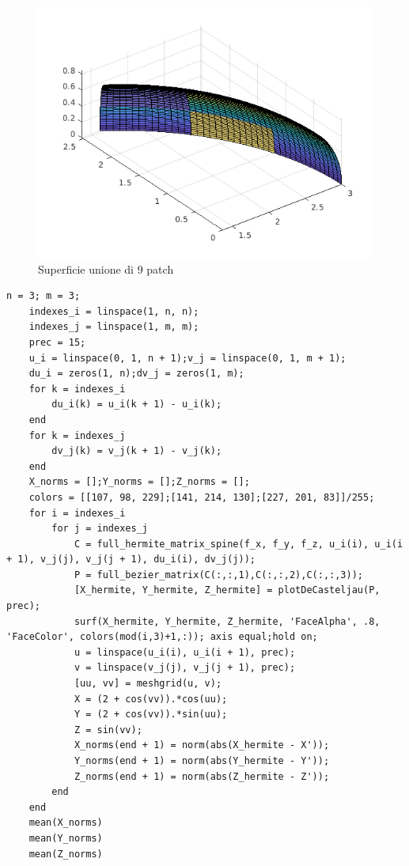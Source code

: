 \documentclass[12pt]{article}
\begin{document}
\begin{figure}[H]
    \centering

    \includegraphics[scale=0.5]{img/spline3nmpatch.png}

    \caption{Superficie unione di 9 patch }\label{fig:8}
\end{figure}
\newpage
\begin{lstlisting}[caption={Errore interpolazione caso spline}, style=matlab, label={patchnm9}, captionpos=b]
	n = 3; m = 3;
	indexes_i = linspace(1, n, n);
	indexes_j = linspace(1, m, m);
	prec = 15;
	u_i = linspace(0, 1, n + 1);v_j = linspace(0, 1, m + 1);
	du_i = zeros(1, n);dv_j = zeros(1, m);
	for k = indexes_i
		du_i(k) = u_i(k + 1) - u_i(k);
	end
	for k = indexes_j
		dv_j(k) = v_j(k + 1) - v_j(k);
	end
	X_norms = [];Y_norms = [];Z_norms = [];
	colors = [[107, 98, 229];[141, 214, 130];[227, 201, 83]]/255;	
	for i = indexes_i
		for j = indexes_j
			C = full_hermite_matrix_spine(f_x, f_y, f_z, u_i(i), u_i(i + 1), v_j(j), v_j(j + 1), du_i(i), dv_j(j));
			P = full_bezier_matrix(C(:,:,1),C(:,:,2),C(:,:,3));
			[X_hermite, Y_hermite, Z_hermite] = plotDeCasteljau(P, prec);
			surf(X_hermite, Y_hermite, Z_hermite, 'FaceAlpha', .8, 'FaceColor', colors(mod(i,3)+1,:)); axis equal;hold on;
			u = linspace(u_i(i), u_i(i + 1), prec);
			v = linspace(v_j(j), v_j(j + 1), prec);
			[uu, vv] = meshgrid(u, v);
			X = (2 + cos(vv)).*cos(uu);
			Y = (2 + cos(vv)).*sin(uu);
			Z = sin(vv);
			X_norms(end + 1) = norm(abs(X_hermite - X'));
			Y_norms(end + 1) = norm(abs(Y_hermite - Y'));
			Z_norms(end + 1) = norm(abs(Z_hermite - Z'));
		end
	end
	mean(X_norms)
	mean(Y_norms)
	mean(Z_norms)
\end{lstlisting}
\end{document}
